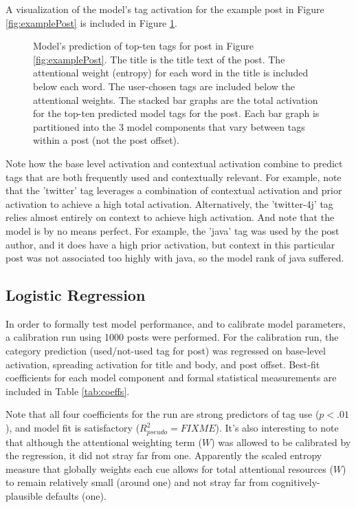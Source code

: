 \documentclass[10pt,letterpaper]{article}
\begin{document}
A visualization of the model's tag activation for the example post in Figure \ref{fig:examplePost} is included in Figure \ref{fig:modelPost}.

\begin{figure}[ht]
  \centering
  \caption{
    Model's prediction of top-ten tags for post in Figure \ref{fig:examplePost}.
    The title is the title text of the post.
    The attentional weight (entropy) for each word in the title is included below each word.
    The user-chosen tags are included below the attentional weights.
    The stacked bar graphs are the total activation for the top-ten predicted model tags for the post.
    Each bar graph is partitioned into the 3 model components that vary between tags within a post (not the post offset).
}
  \label{fig:modelPost}
\end{figure}

Note how the base level activation and contextual activation combine to predict tags that are both frequently used and contextually relevant.
For example, note that the 'twitter' tag leverages a combination of contextual activation and prior activation to achieve a high total activation.
Alternatively, the 'twitter-4j' tag relies almost entirely on context to achieve high activation.
And note that the model is by no means perfect.
For example, the 'java' tag was used by the post author, and it does have a high prior activation, but context in this particular post was not associated too highly with java, so the model rank of java suffered.

\subsection{Logistic Regression}

In order to formally test model performance, and to calibrate model parameters, a calibration run using \num{1000} posts were performed.
For the calibration run, the category prediction (used/not-used tag for post) was regressed on base-level activation, spreading activation for title and body, and post offset.
Best-fit coefficients for each model component and formal statistical measurements are included in Table \ref{tab:coeffs}.

Note that all four coefficients for the run are strong predictors of tag use ($p<.01$), and model fit is satisfactory ($R_{pseudo}^{2}=FIXME$).
It's also interesting to note that although the attentional weighting term ($W$) was allowed to be calibrated by the regression, it did not stray far from one.
Apparently the scaled entropy measure that globally weights each cue allows for total attentional resources ($W$) to remain relatively small (around one) and not stray far from cognitively-plausible defaults (one).
\end{document}
